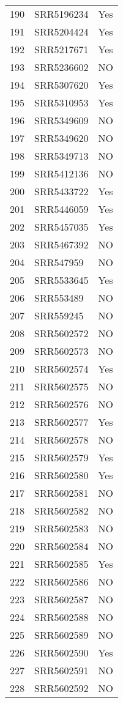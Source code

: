 \begin{table}[ht]
\begin{tabular}{rll}
  190 & SRR5196234 & Yes \\ 
  191 & SRR5204424 & Yes \\ 
  192 & SRR5217671 & Yes \\ 
  193 & SRR5236602 & NO \\ 
  194 & SRR5307620 & Yes \\ 
  195 & SRR5310953 & Yes \\ 
  196 & SRR5349609 & NO \\ 
  197 & SRR5349620 & NO \\ 
  198 & SRR5349713 & NO \\ 
  199 & SRR5412136 & NO \\ 
  200 & SRR5433722 & Yes \\ 
  201 & SRR5446059 & Yes \\ 
  202 & SRR5457035 & Yes \\ 
  203 & SRR5467392 & NO \\ 
  204 & SRR547959 & NO \\ 
  205 & SRR5533645 & Yes \\ 
  206 & SRR553489 & NO \\ 
  207 & SRR559245 & NO \\ 
  208 & SRR5602572 & NO \\ 
  209 & SRR5602573 & NO \\ 
  210 & SRR5602574 & Yes \\ 
  211 & SRR5602575 & NO \\ 
  212 & SRR5602576 & NO \\ 
  213 & SRR5602577 & Yes \\ 
  214 & SRR5602578 & NO \\ 
  215 & SRR5602579 & Yes \\ 
  216 & SRR5602580 & Yes \\ 
  217 & SRR5602581 & NO \\ 
  218 & SRR5602582 & NO \\ 
  219 & SRR5602583 & NO \\ 
  220 & SRR5602584 & NO \\ 
  221 & SRR5602585 & Yes \\ 
  222 & SRR5602586 & NO \\ 
  223 & SRR5602587 & NO \\ 
  224 & SRR5602588 & NO \\ 
  225 & SRR5602589 & NO \\ 
  226 & SRR5602590 & Yes \\ 
  227 & SRR5602591 & NO \\ 
  228 & SRR5602592 & NO \\ 

\end{tabular}
\end{table}
